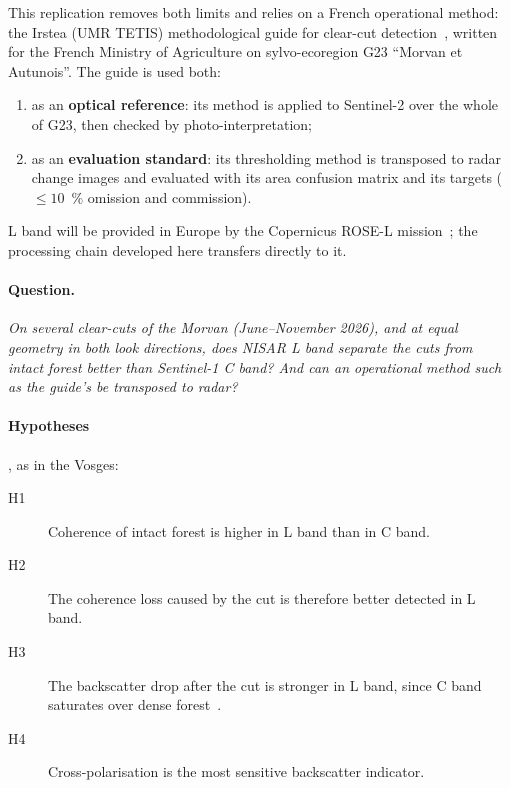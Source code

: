 \documentclass[11pt,a4paper]{article}
\begin{document}
This replication removes both limits and relies on a French operational method: the Irstea (UMR TETIS)
methodological guide for clear-cut detection~\cite{ose2015guide}, written for the French Ministry of Agriculture on
sylvo-ecoregion G23 \enquote{Morvan et Autunois}. The guide is used both:
\begin{enumerate}
\item as an \textbf{optical reference}: its method is applied to Sentinel-2 over the whole of G23, then checked by
  photo-interpretation;
\item as an \textbf{evaluation standard}: its thresholding method is transposed to radar change images and
  evaluated with its area confusion matrix and its targets ($\leq 10$~\% omission and commission).
\end{enumerate}
L band will be provided in Europe by the Copernicus ROSE-L mission~\cite{esa2020rosel}; the processing chain
developed here transfers directly to it.

\paragraph{Question.} \emph{On several clear-cuts of the Morvan (June--November 2026), and at equal geometry in
both look directions, does NISAR L band separate the cuts from intact forest better than Sentinel-1 C band? And can
an operational method such as the guide's be transposed to radar?}

\paragraph{Hypotheses}, as in the Vosges:
\begin{description}
\item[H1] Coherence of intact forest is higher in L band than in C band.
\item[H2] The coherence loss caused by the cut is therefore better detected in L band.
\item[H3] The backscatter drop after the cut is stronger in L band, since C band saturates over dense
  forest~\cite{imhoff1995saturation,joshi2015mapping}.
\item[H4] Cross-polarisation is the most sensitive backscatter indicator.
\end{description}





\printbibliography[heading=bibintoc,title={References}]
\end{document}
